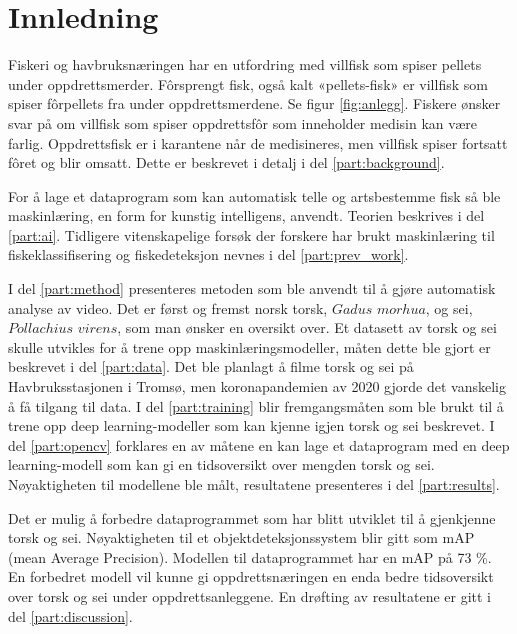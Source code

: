 \section{Innledning}




Fiskeri og havbruksnæringen har en utfordring med villfisk som spiser pellets under oppdrettsmerder. Fôrsprengt fisk, også kalt «pellets-fisk» er villfisk som spiser fôrpellets fra under oppdrettsmerdene. Se figur \ref{fig:anlegg}. Fiskere ønsker svar på om villfisk som spiser oppdrettsfôr som inneholder medisin kan være farlig. Oppdrettsfisk er i karantene når de medisineres, men villfisk spiser fortsatt fôret og blir omsatt. Dette er beskrevet i detalj i del \ref{part:background}.

For å lage et dataprogram som kan automatisk telle og artsbestemme fisk så ble maskinlæring, en form for kunstig intelligens, anvendt. Teorien beskrives i del \ref{part:ai}. Tidligere vitenskapelige forsøk der forskere har brukt maskinlæring til fiskeklassifisering og fiskedeteksjon nevnes i del \ref{part:prev_work}. 

I del \ref{part:method} presenteres metoden som ble anvendt til å gjøre automatisk analyse av video. Det er først og fremst norsk torsk, $Gadus$ $morhua$, og sei, $Pollachius$ $virens$, som man ønsker en oversikt over. Et datasett av torsk og sei skulle utvikles for å trene opp maskinlæringsmodeller, måten dette ble gjort er beskrevet i del \ref{part:data}. Det ble planlagt å filme torsk og sei på Havbruksstasjonen i Tromsø, men koronapandemien av 2020 gjorde det vanskelig å få tilgang til data. I del \ref{part:training} blir fremgangsmåten som ble brukt til å trene opp deep learning-modeller som kan kjenne igjen torsk og sei beskrevet. I del \ref{part:opencv} forklares en av måtene en kan lage et dataprogram med en deep learning-modell som kan gi en tidsoversikt over mengden torsk og sei. Nøyaktigheten til modellene ble målt, resultatene presenteres i del \ref{part:results}.

Det er mulig å forbedre dataprogrammet som har blitt utviklet til å gjenkjenne torsk og sei. Nøyaktigheten til et objektdeteksjonssystem blir gitt som mAP (mean Average Precision). Modellen til dataprogrammet har en mAP på 73 \%. En forbedret modell vil kunne gi oppdrettsnæringen en enda bedre tidsoversikt over torsk og sei under oppdrettsanleggene. En drøfting av resultatene er gitt i del \ref{part:discussion}.

